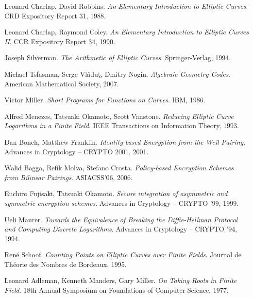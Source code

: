 \begin{thebibliography}{99}

    Leonard Charlap, David Robbins.
    \emph{An Elementary Introduction to Elliptic Curves}.
    CRD Expository Report 31, 1988.

    Leonard Charlap, Raymond Coley.
    \emph{An Elementary Introduction to Elliptic Curves II}.
    CCR Expository Report 34, 1990.

    Joseph Silverman.
    \emph{The Arithmetic of Elliptic Curves}.
    Springer-Verlag, 1994.

    Michael Tsfasman, Serge  Vl\v{a}du\c{t}, Dmitry Nogin.
    \emph{Algebraic Geometry Codes}.
    American Mathematical Society, 2007.

    Victor Miller.
    \emph{Short Programs for Functions on Curves}.
    IBM, 1986.

    Alfred Menezes, Tatsuaki Okamoto, Scott Vanstone.
    \emph{Reducing Elliptic Curve Logarithms in a Finite Field}.
    IEEE Transactions on Information Theory, 1993.

    Dan Boneh, Matthew Franklin.
    \emph{Identity-based Encryption from the Weil Pairing}.
    Advances in Cryptology -- CRYPTO 2001, 2001.

    Walid Bagga, Refik Molva, Stefano Crosta.
    \emph{Policy-based Encryption Schemes from Bilinear Pairings}.
    ASIACSS'06, 2006.

    Eiichiro Fujisaki, Tatsuaki Okamoto.
    \emph{Secure integration of asymmetric and symmetric encryption schemes}.
    Advances in Cryptology -- CRYPTO '99, 1999.

    Ueli Maurer.
    \emph{Towards the Equivalence of Breaking the Diffie-Hellman Protocol
        and Computing Discrete Logarithms}.
    Advances in Cryptology -- CRYPTO '94, 1994.

    René Schoof.
    \emph{Counting Points on Elliptic Curves over Finite Fields}.
    Journal de Théorie des Nombres de Bordeaux, 1995.

    Leonard Adleman, Kenneth Manders, Gary Miller.
    \emph{On Taking Roots in Finite Field}.
    18th Annual Symposium on Foundations of Computer Science, 1977.


\end{thebibliography}

